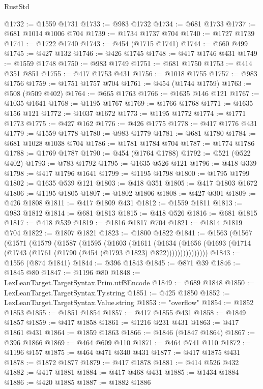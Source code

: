 \begin{lexlean}{RustStd}
\begin{coremodule}
{\begin{coremodule}
{{{{{{{{{{{{{{{{{{{{{{{{{{{{{{{{@1732 := @1559 @1731
@1733 := @983 @1732
@1734 := @681 @1733
@1737 := @681 @1014 @1006 @704
@1739 := @1734 @1737 @704
@1740 := @1727 @1739
@1741 := @1722 @1740
@1743 := @454 (@1715 @1741)
@1744 := @660 @499
@1745 := @427 @132
@1746 := @426 @1745
@1748 := @417 @1746 @431
@1749 := @1559 @1748
@1750 := @983 @1749
@1751 := @681 @1750
@1753 := @414 @351 @851
@1755 := @417 @1753 @431
@1756 := @1018 @1755
@1757 := @983 @1756
@1759 := @1751 @1757 @704
@1761 := @454 (@1744 @1759)
@1763 := @508 (@509 @402)
@1764 := @665 @1763
@1766 := @1635 @146 @121
@1767 := @1035 @1641
@1768 := @1195 @1767
@1769 := @1766 @1768
@1771 := @1635 @156 @121
@1772 := @1037 @1672
@1773 := @1195 @1772
@1774 := @1771 @1773
@1775 := @427 @162
@1776 := @426 @1775
@1778 := @417 @1776 @431
@1779 := @1559 @1778
@1780 := @983 @1779
@1781 := @681 @1780
@1784 := @681 @1028 @1038 @704
@1786 := @1781 @1784 @704
@1787 := @1774 @1786
@1788 := @1769 @1787
@1790 := @454 (@1764 @1788)
@1792 := @521 (@522 @402)
@1793 := @783 @1792
@1795 := @1635 @526 @121
@1796 := @418 @339
@1798 := @417 @1796 @1641
@1799 := @1195 @1798
@1800 := @1795 @1799
@1802 := @1635 @539 @121
@1803 := @418 @351
@1805 := @417 @1803 @1672
@1806 := @1195 @1805
@1807 := @1802 @1806
@1808 := @427 @301
@1809 := @426 @1808
@1811 := @417 @1809 @431
@1812 := @1559 @1811
@1813 := @983 @1812
@1814 := @681 @1813
@1815 := @418 @526
@1816 := @681 @1815
@1817 := @418 @539
@1819 := @1816 @1817 @704
@1821 := @1814 @1819 @704
@1822 := @1807 @1821
@1823 := @1800 @1822
@1841 := @1563
    (@1567
      (@1571
        (@1579
          (@1587
            (@1595
              (@1603
                (@1611
                  (@1634
                    (@1656
                      (@1693 (@1714 (@1743 (@1761 (@1790 (@454 (@1793 @1823) @822)))))))))))))))
@1843 := @1556 (@874 @1841)
@1844 := @396 @1843
@1845 := @871 @39
@1846 := @1845 @80
@1847 := @1196 @80
@1848 := LexLeanTarget.TargetSyntax.Prim.utf8Encode
@1849 := @689 @1848
@1850 := LexLeanTarget.TargetSyntax.Ty.string
@1851 := @425 @1850
@1852 := LexLeanTarget.TargetSyntax.Value.string
@1853 := "overflow"
@1854 := @1852 @1853
@1855 := @1851 @1854
@1857 := @417 @1855 @431
@1858 := @1849 @1857
@1859 := @417 @1858
@1861 := @1216 @231 @431
@1863 := @417 @1861 @431
@1864 := @1859 @1863
@1866 := @1846 (@1847 @1864)
@1867 := @396 @1866
@1869 := @464 @609 @110
@1871 := @464 @741 @110
@1872 := @1196 @157
@1875 := @464 @471 @340 @431
@1877 := @417 @1875 @431
@1878 := @1872 @1877
@1879 := @417 @1878
@1881 := @414 @526 @432
@1882 := @417 @1881
@1884 := @417 @468 @431
@1885 := @1434 @1884
@1886 := @420 @1885
@1887 := @1882 @1886
}}}}}}}}}}}}}}}}}}}}}}}}}}}}}}}}
\end{coremodule}}
\end{coremodule}
\end{lexlean}
